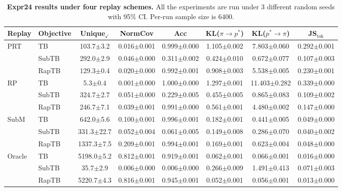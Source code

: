 \documentclass{article}
\theoremstyle{plain}
\theoremstyle{definition}
\theoremstyle{remark}
\begin{document}
\begin{table}[t]
\centering
\small
\setlength{\tabcolsep}{5pt}
\renewcommand{\arraystretch}{1.08}
\caption{\textbf{Expr24 results under four replay schemes.} All the experiments are run under 3 different random seeds with 95\% CI. Per-run sample size is 6400.}
\label{tab:expr24_main_ci}
\begin{tabular}{llcccccc}
\toprule
Replay & Objective & Unique$_\checkmark$ & NormCov & Acc & KL($\pi\!\to\!p^*$) & KL($p^*\!\to\!\pi$) & JS$_{\text{tok}}$ \\
\midrule
\multirow{3}{*}{PRT} & TB & 103.7$\pm$3.2 & 0.016$\pm$0.001 & 0.999$\pm$0.000 & 1.105$\pm$0.002 & 7.803$\pm$0.060 & 0.292$\pm$0.001 \\
 & SubTB & 292.0$\pm$2.9 & 0.046$\pm$0.000 & 0.311$\pm$0.002 & 0.424$\pm$0.010 & 0.672$\pm$0.077 & 0.107$\pm$0.003 \\
 & RapTB & 129.3$\pm$0.4 & 0.020$\pm$0.000 & 0.992$\pm$0.001 & 0.908$\pm$0.003 & 5.538$\pm$0.005 & 0.230$\pm$0.001 \\
\midrule
\multirow{3}{*}{RP} & TB & 5.3$\pm$0.4 & 0.001$\pm$0.000 & 1.000$\pm$0.000 & 1.297$\pm$0.001 & 11.403$\pm$0.282 & 0.339$\pm$0.000 \\
 & SubTB & 324.7$\pm$2.7 & 0.051$\pm$0.000 & 0.229$\pm$0.005 & 0.455$\pm$0.005 & 0.865$\pm$0.083 & 0.109$\pm$0.002 \\
 & RapTB & 246.7$\pm$7.1 & 0.039$\pm$0.001 & 0.991$\pm$0.000 & 0.561$\pm$0.001 & 4.480$\pm$0.002 & 0.147$\pm$0.000 \\
\midrule
\multirow{3}{*}{SubM} & TB & 642.0$\pm$5.6 & 0.100$\pm$0.001 & 0.996$\pm$0.001 & 0.182$\pm$0.001 & 0.441$\pm$0.005 & 0.049$\pm$0.000 \\
 & SubTB & 331.3$\pm$22.7 & 0.052$\pm$0.004 & 0.061$\pm$0.005 & 0.149$\pm$0.008 & 0.286$\pm$0.070 & 0.040$\pm$0.002 \\
 & RapTB & 1337.3$\pm$7.5 & 0.209$\pm$0.001 & 0.994$\pm$0.001 & 0.169$\pm$0.001 & 0.623$\pm$0.004 & 0.048$\pm$0.000 \\
\midrule
\multirow{3}{*}{Oracle} & TB & 5198.0$\pm$5.2 & 0.812$\pm$0.001 & 0.919$\pm$0.001 & 0.062$\pm$0.001 & 0.066$\pm$0.001 & 0.016$\pm$0.000 \\
 & SubTB & 35.7$\pm$2.9 & 0.006$\pm$0.000 & 0.006$\pm$0.000 & 0.266$\pm$0.009 & 1.491$\pm$0.413 & 0.071$\pm$0.003 \\
 & RapTB & 5220.7$\pm$4.3 & 0.816$\pm$0.001 & 0.945$\pm$0.001 & 0.052$\pm$0.001 & 0.056$\pm$0.001 & 0.013$\pm$0.000 \\
\bottomrule
\end{tabular}
\end{table}
\end{document}
